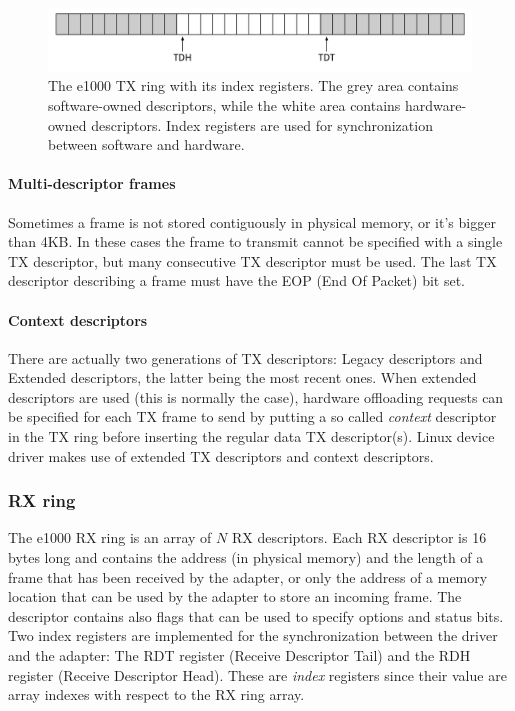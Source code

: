 \begin{figure}[bt]
\centering
\includegraphics[scale = 0.35]{tx-ring.pdf}
\caption{The e1000 TX ring with its index registers. The grey area contains software-owned descriptors, while the white area
	contains hardware-owned descriptors. Index registers are used for synchronization between software and hardware.}
\label{fig:txring}
\end{figure}

\paragraph{Multi-descriptor frames}
Sometimes a frame is not stored contiguously in physical memory, or it's bigger than 4KB. In these cases the frame to transmit cannot
be specified with a single TX descriptor, but many consecutive TX descriptor must be used. The last TX descriptor describing a frame
must have the EOP (End Of Packet) bit set.

\paragraph{Context descriptors}
There are actually two generations of TX descriptors: Legacy descriptors and Extended descriptors, the latter being the most
recent ones.
When extended descriptors are used (this is normally the case), hardware offloading requests can be specified for each TX frame to send
by putting a so called \emph{context} descriptor in the TX ring before inserting the regular data TX descriptor(s).
Linux device driver makes use of extended TX descriptors and context descriptors.


\subsubsection{RX ring}
\label{sec:rxring}
The e1000 RX ring is an array of $N$ RX descriptors. Each RX descriptor is 16 bytes long and contains the address (in physical 
memory) and the length of a frame that has been received by the adapter, or only the address of a memory location that can be
used by the adapter to store an incoming frame. The descriptor contains also flags that can be used to specify options and status bits.
Two index registers are implemented for the synchronization between the driver and the adapter:
The RDT register (Receive Descriptor Tail) and the RDH register (Receive Descriptor Head). These are \emph{index} registers since
their value are array indexes with respect to the RX ring array.

